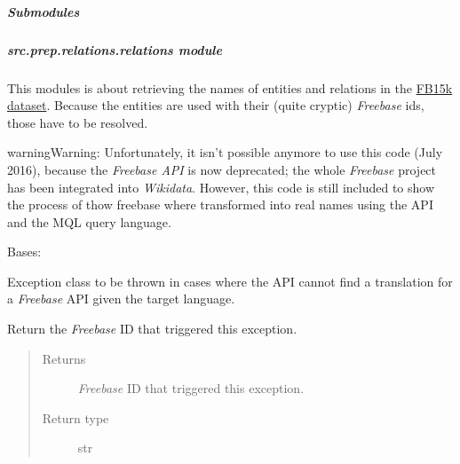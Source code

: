 \documentclass[letterpaper,10pt,english]{sphinxmanual}
\begin{document}
\subparagraph{Submodules}
\label{src.prep.relations:submodules}

\subparagraph{src.prep.relations.relations module}
\label{src.prep.relations:src-prep-relations-relations-module}\label{src.prep.relations:module-src.prep.relations.relations}
This modules is about retrieving the names of entities and relations in the
\href{https://everest.hds.utc.fr/doku.php?id=en:smemlj12}{FB15k dataset}. Because the entities are
used with their (quite cryptic) \emph{Freebase} ids, those have to be resolved.

\begin{notice}{warning}{Warning:}
Unfortunately, it isn't possible anymore to use this code (July 2016), because the \emph{Freebase API} is now
deprecated; the whole \emph{Freebase} project has been integrated into \emph{Wikidata}. However, this code is still
included to show the process of thow freebase where transformed into real names using the API and the MQL query
language.
\end{notice}

\begin{fulllineitems}
\label{src.prep.relations:src.prep.relations.relations.MissingTranslationException}
Bases: 

Exception class to be thrown in cases where the API cannot find a translation for a \emph{Freebase} API given the
target language.

\begin{fulllineitems}
\label{src.prep.relations:src.prep.relations.relations.MissingTranslationException.get_id}
Return the \emph{Freebase} ID that triggered this exception.
\begin{quote}\begin{description}
\item[{Returns}] \leavevmode
\emph{Freebase} ID that triggered this exception.

\item[{Return type}] \leavevmode
str

\end{description}\end{quote}

\end{fulllineitems}


\end{fulllineitems}
\end{document}
